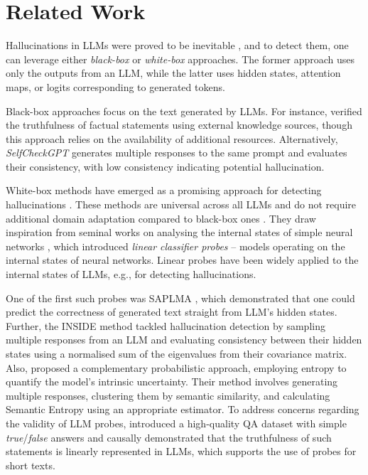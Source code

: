 \section{Related Work}
Hallucinations in LLMs were proved to be inevitable \citep{xu_hallucination_2024}, and to detect them, one can leverage either \textit{black-box} or \textit{white-box} approaches. The former approach uses only the outputs from an LLM, while the latter uses hidden states, attention maps, or logits corresponding to generated tokens.

Black-box approaches focus on the text generated by LLMs. For instance, \citep{li_dawn_2024} verified the truthfulness of factual statements using external knowledge sources, though this approach relies on the availability of additional resources. Alternatively, \textit{SelfCheckGPT} \citep{manakul_selfcheckgpt_2023} generates multiple responses to the same prompt and evaluates their consistency, with low consistency indicating potential hallucination.

White-box methods have emerged as a promising approach for detecting hallucinations \citep{farquhar_detecting_2024, azaria_internal_2023, arteaga_hallucination_2024, orgad_llms_2025}. These methods are universal across all LLMs and do not require additional domain adaptation compared to black-box ones \citep{farquhar_detecting_2024}. They draw inspiration from seminal works on analysing the internal states of simple neural networks \citep{alain_understanding_2016}, which introduced \textit{linear classifier probes} -- models operating on the internal states of neural networks. Linear probes have been widely applied to the internal states of LLMs, e.g., for detecting hallucinations. 

One of the first such probes was SAPLMA \citep{azaria_internal_2023}, which demonstrated that one could predict the correctness of generated text straight from LLM's hidden states. Further, the INSIDE method \citep{chen_inside_2024} tackled hallucination detection by sampling multiple responses from an LLM and evaluating consistency between their hidden states using a normalised sum of the eigenvalues from their covariance matrix. Also, \citep{farquhar_detecting_2024} proposed a complementary probabilistic approach, employing entropy to quantify the model's intrinsic uncertainty. Their method involves generating multiple responses, clustering them by semantic similarity, and calculating Semantic Entropy using an appropriate estimator. To address concerns regarding the validity of LLM probes, \citep{marks_geometry_2024} introduced a high-quality QA dataset with simple \textit{true}/\textit{false} answers and causally demonstrated that the truthfulness of such statements is linearly represented in LLMs, which supports the use of probes for short texts.

